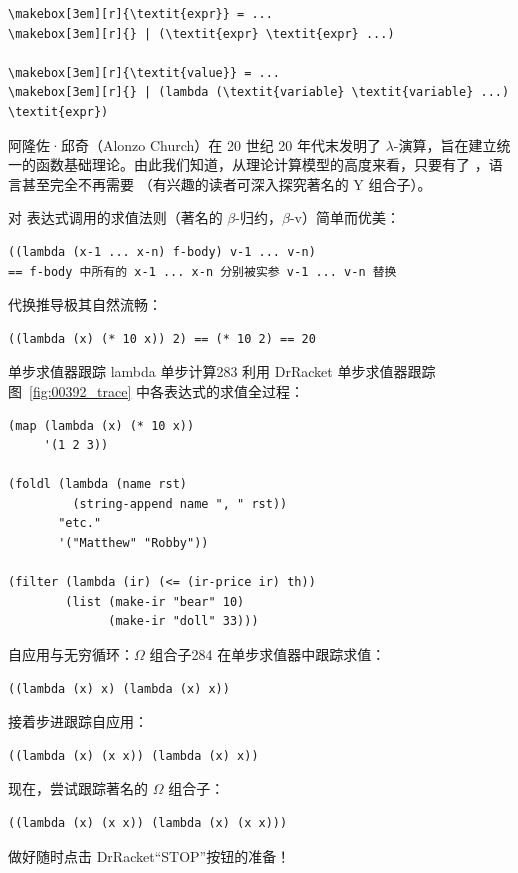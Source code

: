 \begin{stepperbox}[unbreakable]
\begin{Verbatim}[commandchars=\\\{\}, fontsize=\footnotesize]
\makebox[3em][r]{\textit{expr}} = ...
\makebox[3em][r]{} | (\textit{expr} \textit{expr} ...)

\makebox[3em][r]{\textit{value}} = ...
\makebox[3em][r]{} | (lambda (\textit{variable} \textit{variable} ...) \textit{expr})
\end{Verbatim}
\end{stepperbox}

\begin{notebox}
阿隆佐·邱奇（Alonzo Church）在 20 世纪 20 年代末发明了 $\lambda$-演算，旨在建立统一的函数基础理论。由此我们知道，从理论计算模型的高度来看，只要有了 ，语言甚至完全不再需要 （有兴趣的读者可深入探究著名的 Y 组合子）。
\end{notebox}

对  表达式调用的求值法则（著名的 $\beta$-归约，$\beta$-v）简单而优美：

\begin{lstlisting}[language=BSL]
((lambda (x-1 ... x-n) f-body) v-1 ... v-n)
== f-body 中所有的 x-1 ... x-n 分别被实参 v-1 ... v-n 替换
\end{lstlisting}

代换推导极其自然流畅：
\begin{lstlisting}[language=BSL]
((lambda (x) (* 10 x)) 2) == (* 10 2) == 20
\end{lstlisting}

\begin{exercise}{单步求值器跟踪 lambda 单步计算}{283}
利用 DrRacket 单步求值器跟踪图~\ref{fig:00392_trace} 中各表达式的求值全过程：

\begin{lstlisting}[language=BSL]
(map (lambda (x) (* 10 x))
     '(1 2 3))

(foldl (lambda (name rst)
         (string-append name ", " rst))
       "etc."
       '("Matthew" "Robby"))

(filter (lambda (ir) (<= (ir-price ir) th))
        (list (make-ir "bear" 10)
              (make-ir "doll" 33)))
\end{lstlisting}
\label{fig:00392_trace}
\end{exercise}

\begin{exercise}{自应用与无穷循环：$\Omega$ 组合子}{284}
在单步求值器中跟踪求值：
\begin{lstlisting}[language=BSL]
((lambda (x) x) (lambda (x) x))
\end{lstlisting}
接着步进跟踪自应用：
\begin{lstlisting}[language=BSL]
((lambda (x) (x x)) (lambda (x) x))
\end{lstlisting}
现在，尝试跟踪著名的 $\Omega$ 组合子：
\begin{lstlisting}[language=BSL]
((lambda (x) (x x)) (lambda (x) (x x)))
\end{lstlisting}
做好随时点击 DrRacket“STOP”按钮的准备！
\end{exercise}

